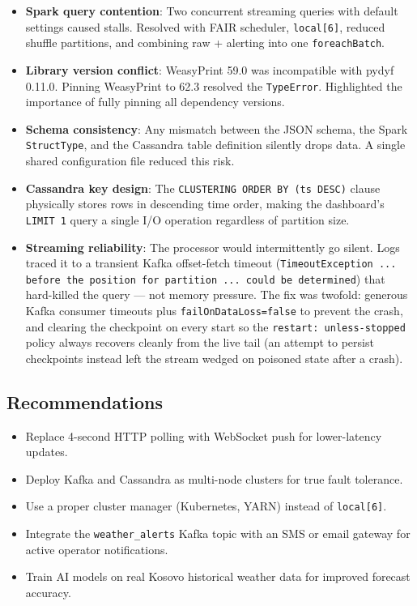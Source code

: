 \documentclass[conference,a4paper]{IEEEtran}
\begin{document}
\begin{itemize}
  \item \textbf{Spark query contention}: Two concurrent streaming queries with default settings caused stalls. Resolved with FAIR scheduler, \texttt{local[6]}, reduced shuffle partitions, and combining raw + alerting into one \texttt{foreachBatch}.
  \item \textbf{Library version conflict}: WeasyPrint 59.0 was incompatible with pydyf 0.11.0. Pinning WeasyPrint to 62.3 resolved the \texttt{TypeError}. Highlighted the importance of fully pinning all dependency versions.
  \item \textbf{Schema consistency}: Any mismatch between the JSON schema, the Spark \texttt{StructType}, and the Cassandra table definition silently drops data. A single shared configuration file reduced this risk.
  \item \textbf{Cassandra key design}: The \texttt{CLUSTERING ORDER BY (ts DESC)} clause physically stores rows in descending time order, making the dashboard's \texttt{LIMIT~1} query a single I/O operation regardless of partition size.
  \item \textbf{Streaming reliability}: The processor would intermittently go silent. Logs traced it to a transient Kafka offset-fetch timeout (\texttt{TimeoutException ... before the position for partition ... could be determined}) that hard-killed the query --- not memory pressure. The fix was twofold: generous Kafka consumer timeouts plus \texttt{failOnDataLoss=false} to prevent the crash, and clearing the checkpoint on every start so the \texttt{restart: unless-stopped} policy always recovers cleanly from the live tail (an attempt to persist checkpoints instead left the stream wedged on poisoned state after a crash).
\end{itemize}

\subsection{Recommendations}

\begin{itemize}
  \item Replace 4-second HTTP polling with WebSocket push for lower-latency updates.
  \item Deploy Kafka and Cassandra as multi-node clusters for true fault tolerance.
  \item Use a proper cluster manager (Kubernetes, YARN) instead of \texttt{local[6]}.
  \item Integrate the \texttt{weather\_alerts} Kafka topic with an SMS or email gateway for active operator notifications.
  \item Train AI models on real Kosovo historical weather data for improved forecast accuracy.
\end{itemize}
\end{document}
